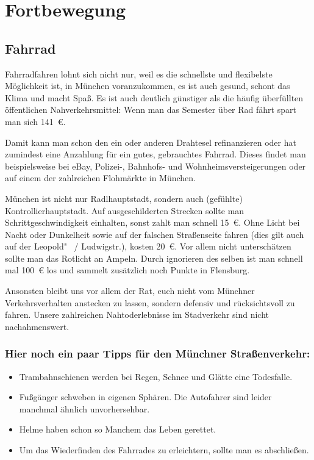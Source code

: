 ﻿
\chapter{Fortbewegung}

\section{Fahrrad}

Fahrradfahren lohnt sich nicht nur, weil es die schnellste und
flexibelste Möglichkeit ist, in München voranzukommen, es ist auch
gesund, schont das Klima und macht Spaß.  Es ist auch deutlich
günstiger als die häufig überfüllten öffentlichen Nahverkehrsmittel:
Wenn man das Semester über Rad fährt spart man sich 141~€.

Damit kann man schon den ein oder anderen Drahtesel refinanzieren oder
hat zumindest eine Anzahlung für ein gutes, gebrauchtes Fahrrad. Dieses
findet man beispielsweise bei eBay, Polizei-, Bahnhofs- und
Wohnheimsversteigerungen oder auf einem der zahlreichen Flohmärkte in
München. 

München ist nicht nur Radlhauptstadt, sondern auch (gefühlte)
Kontrollierhauptstadt. Auf ausgeschilderten Strecken sollte man Schrittgeschwindigkeit
einhalten, sonst zahlt man schnell 15~€. Ohne Licht bei Nacht oder
Dunkelheit sowie auf der falschen Straßenseite fahren
(dies gilt auch auf der Leopold"~ / Ludwigstr.), kosten 20~€.  Vor allem nicht unterschätzen sollte man das Rotlicht
an Ampeln. Durch ignorieren des selben ist man schnell mal 100~€ los und sammelt
zusätzlich noch Punkte in Flensburg.

Ansonsten bleibt uns vor allem der Rat, euch nicht vom Münchner
Verkehrsverhalten anstecken zu lassen, sondern defensiv und rücksichtsvoll zu
fahren. Unsere zahlreichen Nahtoderlebnisse im Stadverkehr sind nicht
nachahmenswert.

\subsection*{Hier noch ein paar Tipps für den Münchner Straßenverkehr:}
\begin{itemize}
	\item Trambahnschienen werden bei Regen, Schnee und Glätte eine Todesfalle.
	\item Fußgänger schweben in eigenen Sphären. Die Autofahrer sind leider 
				manchmal ähnlich unvorhersehbar.
	\item Helme haben schon so Manchem das Leben gerettet.
	\item Um das Wiederfinden des Fahrrades zu erleichtern, sollte man es 
				abschließen.
\end{itemize}

